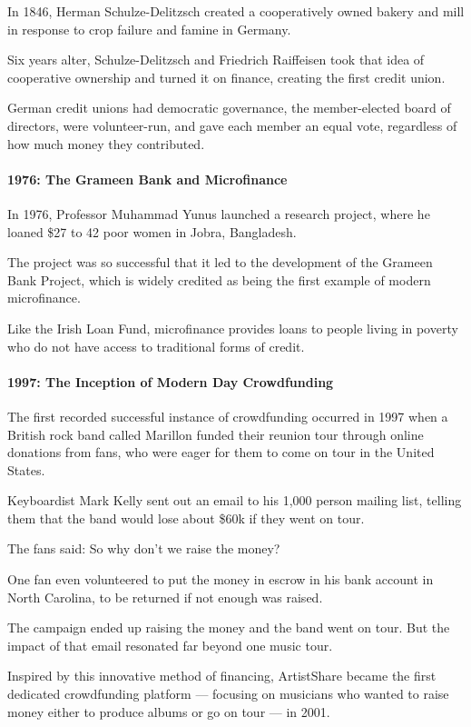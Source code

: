 In 1846, Herman Schulze-Delitzsch created a cooperatively owned bakery and mill in response to crop failure and famine in Germany.

Six years alter, Schulze-Delitzsch and Friedrich Raiffeisen took that idea of cooperative ownership and turned it on finance, creating the first credit union.

German credit unions had democratic governance, the member-elected board of directors, were volunteer-run, and gave each member an equal vote, regardless of how much money they contributed.

\paragraph*{1976: The Grameen Bank and Microfinance}
In 1976, Professor Muhammad Yunus launched a research project, where he loaned \$27 to 42 poor women in Jobra, Bangladesh.

The project was so successful that it led to the development of the Grameen Bank Project, which is widely credited as being the first example of modern microfinance.

Like the Irish Loan Fund, microfinance provides loans to people living in poverty who do not have access to traditional forms of credit.

\paragraph*{1997: The Inception of Modern Day Crowdfunding}
The first recorded successful instance of crowdfunding occurred in 1997 when a British rock band called Marillon funded their reunion tour through online donations from fans, who were eager for them to come on tour in the United States.

Keyboardist Mark Kelly sent out an email to his 1,000 person mailing list, telling them that the band would lose about \$60k if they went on tour.

The fans said: So why don’t we raise the money?

One fan even volunteered to put the money in escrow in his bank account in North Carolina, to be returned if not enough was raised.

The campaign ended up raising the money and the band went on tour. But the impact of that email resonated far beyond one music tour.

Inspired by this innovative method of financing, ArtistShare became the first dedicated crowdfunding platform — focusing on musicians who wanted to raise money either to produce albums or go on tour — in 2001.


